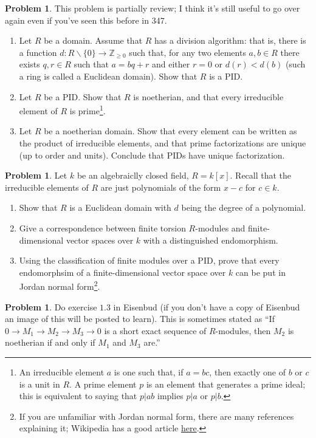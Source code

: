 \documentclass[11pt]{article}
\theoremstyle{definition}
\newtheorem{problem}[theorem]{Problem}
\theoremstyle{definition}
\newcommand{\Z}{\mathbb{Z}}
\begin{document}
\begin{problem}This problem is partially review; I think it's still useful to go over again even if you've seen this before in 347.
\begin{enumerate}[label=(\alph*)]
\item Let $R$ be a domain.  Assume that $R$ has a division algorithm: that is, there is a function $d: R\backslash \{0\} \rightarrow \Z_{\geq 0}$ such that, for any two elements $a, b \in R$ there exists $q, r \in R$ such that $a = bq + r$ and either $r = 0$ or $d(r) < d(b)$ (such a ring is called a Euclidean domain).  Show that $R$ is a PID.
\item Let $R$ be a PID.  Show that $R$ is noetherian, and that every irreducible element of $R$ is prime\footnote{An irreducible element $a$ is one such that, if $a = bc$, then exactly one of $b$ or $c$ is a unit in $R$.  A prime element $p$ is an element that generates a prime ideal; this is equivalent to saying that $p|ab$ implies $p|a$ or $p|b$.}.
\item Let $R$ be a noetherian domain.  Show that every element can be written as the product of irreducible elements, and that prime factorizations are unique (up to order and units).  Conclude that PIDs have unique factorization.
\end{enumerate}
\end{problem}
\begin{problem}
Let $k$ be an algebraiclly closed field, $R = k[x]$.  Recall that the irreducible elements of $R$ are just polynomials of the form $x-c$ for $c \in k$.
\begin{enumerate}[label=(\alph*)]
\item Show that $R$ is a Euclidean domain with $d$ being the degree of a polynomial.
\item Give a correspondence between finite torsion $R$-modules and finite-dimensional vector spaces over $k$ with a distinguished endomorphism.
\item Using the classification of finite modules over a PID, prove that every endomorphsim of a finite-dimensional vector space over $k$ can be put in Jordan normal form\footnote{If you are unfamiliar with Jordan normal form, there are many references explaining it; Wikipedia has a good article \href{https://en.wikipedia.org/wiki/Jordan_normal_form}{here}.}.
\end{enumerate}
\end{problem}
\begin{problem}
Do exercise $1.3$ in Eisenbud (if you don't have a copy of Eisenbud an image of this will be posted to learn). This is sometimes stated as ``If $0 \rightarrow M_1 \rightarrow M_2 \rightarrow M_3 \rightarrow 0$ is a short exact sequence of $R$-modules, then $M_2$ is noetherian if and only if $M_1$ and $M_3$ are.''
\end{problem}
\end{document}
